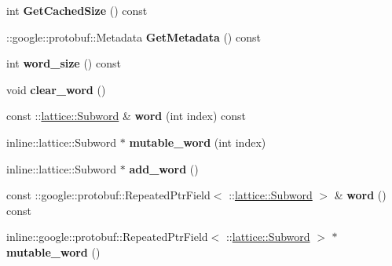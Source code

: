 \begin{DoxyCompactItemize}
\item 
\hypertarget{classlattice_1_1Phraselet_ae94d4b81c0ae8e195346f0b2836fa124}{
int {\bfseries GetCachedSize} () const }
\label{classlattice_1_1Phraselet_ae94d4b81c0ae8e195346f0b2836fa124}

\item 
\hypertarget{classlattice_1_1Phraselet_a604a20b0d6799e17708325a49dbd89ee}{
::google::protobuf::Metadata {\bfseries GetMetadata} () const }
\label{classlattice_1_1Phraselet_a604a20b0d6799e17708325a49dbd89ee}

\item 
\hypertarget{classlattice_1_1Phraselet_a5136efd90a23878ff47bb0290c5f9678}{
int {\bfseries word\_\-size} () const }
\label{classlattice_1_1Phraselet_a5136efd90a23878ff47bb0290c5f9678}

\item 
\hypertarget{classlattice_1_1Phraselet_a2ac956bf60b94eab43cb142bb2251731}{
void {\bfseries clear\_\-word} ()}
\label{classlattice_1_1Phraselet_a2ac956bf60b94eab43cb142bb2251731}

\item 
\hypertarget{classlattice_1_1Phraselet_a39c2b7f8be4d23aa423baf985107a0be}{
const ::\hyperlink{classlattice_1_1Subword}{lattice::Subword} \& {\bfseries word} (int index) const }
\label{classlattice_1_1Phraselet_a39c2b7f8be4d23aa423baf985107a0be}

\item 
\hypertarget{classlattice_1_1Phraselet_abe2be887d98594a7c3ce13844b8a87f3}{
inline::lattice::Subword $\ast$ {\bfseries mutable\_\-word} (int index)}
\label{classlattice_1_1Phraselet_abe2be887d98594a7c3ce13844b8a87f3}

\item 
\hypertarget{classlattice_1_1Phraselet_af499ae2b30d9739234523c9d790e07eb}{
inline::lattice::Subword $\ast$ {\bfseries add\_\-word} ()}
\label{classlattice_1_1Phraselet_af499ae2b30d9739234523c9d790e07eb}

\item 
\hypertarget{classlattice_1_1Phraselet_ad442b1e821ee49c64e44191d32200e60}{
const ::google::protobuf::RepeatedPtrField$<$ ::\hyperlink{classlattice_1_1Subword}{lattice::Subword} $>$ \& {\bfseries word} () const }
\label{classlattice_1_1Phraselet_ad442b1e821ee49c64e44191d32200e60}

\item 
\hypertarget{classlattice_1_1Phraselet_a4789a16818260e9df5f6cf5b954e70ee}{
inline::google::protobuf::RepeatedPtrField$<$ ::\hyperlink{classlattice_1_1Subword}{lattice::Subword} $>$ $\ast$ {\bfseries mutable\_\-word} ()}
\label{classlattice_1_1Phraselet_a4789a16818260e9df5f6cf5b954e70ee}


\end{DoxyCompactItemize}
